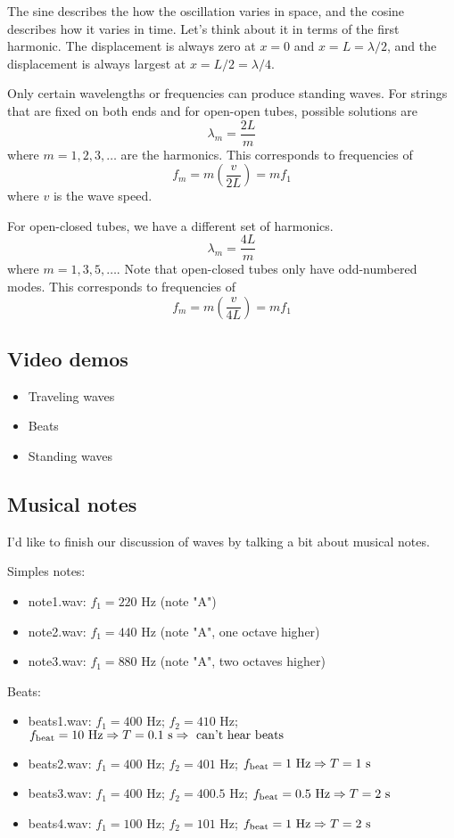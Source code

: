 The sine describes the how the oscillation varies in space, and the cosine describes how it varies in time. Let’s think about it in terms of the first harmonic. The displacement is always zero at $x = 0$ and $x = L = \lambda/2$, and the displacement is always largest at $x = L/2 = \lambda/4$.

 Only certain wavelengths or frequencies can produce standing waves. For strings that are fixed on both ends and for open-open tubes, possible solutions are
  $$\lambda_m=\frac{2L}{m}$$
  where $m=1,2,3,\dots$ are the harmonics. This corresponds to frequencies of
  $$f_m=m\left(\frac{v}{2L}\right)=mf_1$$
  where $v$ is the wave speed. 

  For open-closed tubes, we have a different set of harmonics.
  $$\lambda_m=\frac{4L}{m}$$
  where $m=1,3,5,\dots$. Note that open-closed tubes only have odd-numbered modes. This corresponds to frequencies of
  $$f_m=m\left(\frac{v}{4L}\right)=mf_1$$


\subsection{Video demos}
\begin{itemize}
\item Traveling waves
\item Beats
\item Standing waves
\end{itemize}

  
\subsection{Musical notes}
I'd like to finish our discussion of waves by talking a bit about musical notes.

Simples notes:
\begin{itemize}
\item note1.wav: $f_1=220\mbox{ Hz}$ (note "A")
\item note2.wav: $f_1=440\mbox{ Hz}$ (note "A", one octave higher)
\item note3.wav: $f_1=880\mbox{ Hz}$ (note "A", two octaves higher)
\end{itemize}

Beats:
\begin{itemize}
\item beats1.wav: $f_1=400\mbox{ Hz}$; $f_2=410\mbox{ Hz}$; $f_{\rm beat}=10\mbox{ Hz} \Rightarrow T=0.1\mbox{ s} \Rightarrow \mbox{ can't hear beats}$
\item beats2.wav: $f_1=400\mbox{ Hz}$; $f_2=401\mbox{ Hz}$; $f_{\rm beat}=1\mbox{ Hz} \Rightarrow T=1\mbox{ s}$
\item beats3.wav: $f_1=400\mbox{ Hz}$; $f_2=400.5\mbox{ Hz}$; $f_{\rm beat}=0.5\mbox{ Hz} \Rightarrow T=2\mbox{ s}$
\item beats4.wav: $f_1=100\mbox{ Hz}$; $f_2=101\mbox{ Hz}$; $f_{\rm beat}=1\mbox{ Hz} \Rightarrow T=2\mbox{ s}$
\end{itemize}

